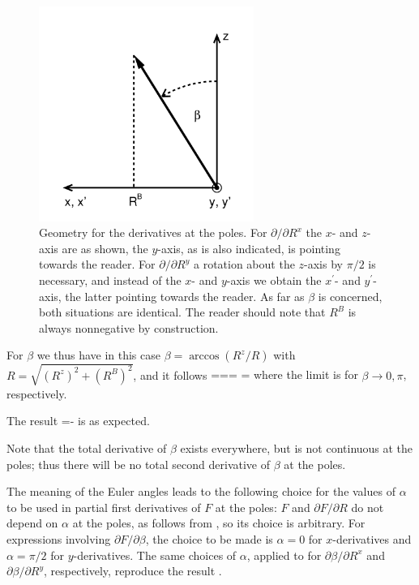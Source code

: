 \begin{figure}
\begin{center}
\includegraphics[width=7cm]{figures/Abbildung2}
\end{center}
\caption[Geometry for the derivatives at the poles]{Geometry for the derivatives at the poles. For $\partial/\partial R^{x}$ the $x$- and $z$-
axis are as shown, the $y$-axis, as is also indicated, is pointing towards the reader.
For $\partial/\partial R^{y}$ a rotation about the $z$-axis by $\pi/2$ is necessary, and instead of the
$x$- and $y$-axis we obtain the $x^{\prime}$- and $y^{\prime}$-axis, the latter pointing towards the
reader. As far as $\beta$ is concerned, both situations are identical. The reader should note that
$R^{B}$ is always nonnegative by construction.}
\label{restricted}
\end{figure}
\par{For $\beta$ we thus have in this case $\beta=\arccos (R^{z}/R)$ with $R=\sqrt{(R^{z})^{2}+(R^{B})^{2}}$,
and it follows}
\be
\label{betalimit}
===
=\rightarrow \pm {}
\ee
where the limit is for $\beta \rightarrow 0,\pi$, respectively.
\par{The result}
\be
{}=-
\ee
is as expected.
\par{Note that the total derivative of $\beta$ exists everywhere, but is not continuous at the poles; thus there
will be no total second derivative of $\beta$ at the poles.}
\par{The meaning of the Euler angles leads to the following choice for the values of $\alpha$ to be used in
partial first derivatives of $F$ at the poles:
$F$ and $\partial F / \partial R$ do not depend on $\alpha$ at the poles, as follows from ,
so its choice is arbitrary.
For expressions involving $\partial F / \partial \beta$, the choice to be made is
$\alpha=0$ for $x$-derivatives and $\alpha=\pi/2$ for $y$-derivatives. The same choices of $\alpha$,
applied to  for $\partial \beta / \partial R^{x}$ and $\partial \beta / \partial R^{y}$,
respectively, reproduce the result .}
